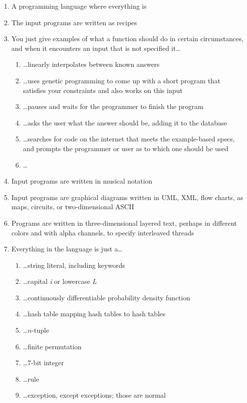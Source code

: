 \documentclass[acmtocl]%
{boviktrans}
\begin{document}
\begin{enumerate}
\item A programming language where everything is
\item The input programs are written as recipes
\item You just give examples of what a function should do in certain circumstances, and when it encounters an input that is not specified it\ldots
  \begin{enumerate}
    \item \ldots linearly interpolates between known answers
    \item \ldots uses genetic programming to come up with a short program that satisfies your constraints and also works on this input
    \item \ldots pauses and waits for the programmer to finish the program
    \item \ldots asks the user what the answer should be, adding it to the database
    \item \ldots searches for code on the internet that meets the example-based specs, and prompts the programmer or user as to which one should be used
    \item \ldots
  \end{enumerate}
\item Input programs are written in musical notation
\item Input programs are graphical diagrams written in UML, XML, flow charts, as maps, circuits, or two-dimensional ASCII
\item Programs are written in three-dimensional layered text, perhaps in different colors and with alpha channels, to specify interleaved threads
\item Everything in the language is just a\ldots
   \begin{enumerate}
     \item \ldots string literal, including keywords
     \item \ldots capital {\it i} or lowercase {\it L}
     \item \ldots continuously differentiable probability density function
     \item \ldots hash table mapping hash tables to hash tables
     \item \ldots $n$-tuple
     \item \ldots finite permutation
     \item \ldots 7-bit integer
     \item \ldots rule
     \item \ldots exception, except exceptions; those are normal

\end{enumerate}
\end{enumerate}
\end{document}

